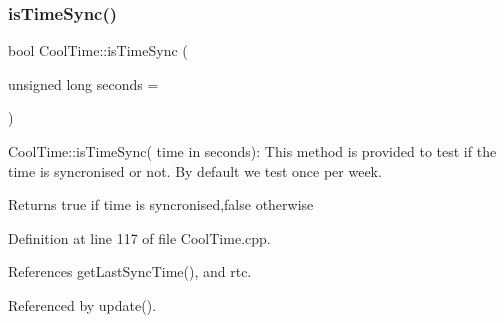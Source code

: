 \subsubsection{\texorpdfstring{is\+Time\+Sync()}{isTimeSync()}}
{\footnotesize\ttfamily bool Cool\+Time\+::is\+Time\+Sync (\begin{DoxyParamCaption}\item[{unsigned long}]{seconds = {} }\end{DoxyParamCaption})}

Cool\+Time\+::is\+Time\+Sync( time in seconds)\+: This method is provided to test if the time is syncronised or not. By default we test once per week.

\begin{DoxyReturn}{Returns}
true if time is syncronised,false otherwise 
\end{DoxyReturn}


Definition at line 117 of file Cool\+Time.\+cpp.



References get\+Last\+Sync\+Time(), and rtc.



Referenced by update().


